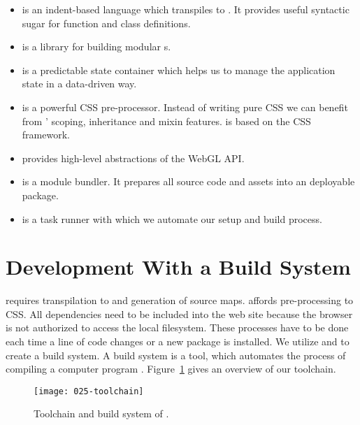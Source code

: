 \documentclass[../ClassicThesis.tex]{subfiles}
\begin{document}
\begin{itemize}
\item {\coffeescript} is an indent-based language which
  transpiles to {\javascript}. It provides useful syntactic
  sugar for function and class definitions.

\item {} is a {\javascript} library for building modular
  {\userinterface}s.

\item {} is a predictable state container which
  helps us to manage the application state in a data-driven
  way.

\item {} is a powerful CSS pre-processor. Instead
  of writing pure CSS we can benefit from '
  scoping, inheritance and mixin features. {\platener} is
  based on the  CSS framework.

\item \name{\threejs} provides high-level abstractions of
  the WebGL API.

\item {} is a module bundler. It prepares all
  source code and assets into an deployable package.

\item {} is a {\javascript} task runner with which
  we automate our setup and build process.
\end{itemize}

\section{Development With a Build System}

{\coffescript} requires transpilation to {\javascript} and
generation of source maps.  affords
pre-processing to CSS. All dependencies need to be included
into the web site because the browser is not authorized to
access the local filesystem. These processes have to be done
each time a line of code changes or a new package is
installed. We utilize  and  to
create a build system. A build system is a tool, which
automates the process of compiling a computer program
\cite{build-system}. Figure~\ref{} gives an overview of our
toolchain.

\begin{figure}[h]
  \centering
  \texttt{[image: 025-toolchain]}
  \caption{Toolchain and build system of {\platener}.}
  \label{fig:toolchain}
\end{figure}
\end{document}
